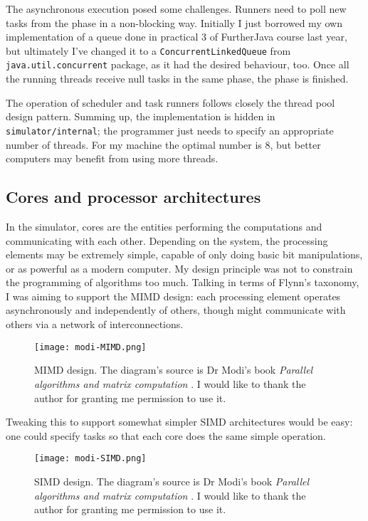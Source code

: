 \documentclass[12pt,a4paper,twoside,openright]{report}
\begin{document}
The asynchronous execution posed some challenges. Runners need to poll new tasks from the phase in a non-blocking way. Initially I just borrowed my own implementation of a queue done in practical 3 of FurtherJava course last year, but ultimately I've changed it to a  \texttt{ConcurrentLinkedQueue} from \texttt{java.util.concurrent} package, as it had the desired behaviour, too. Once all the running threads receive null tasks in the same phase, the phase is finished.

The operation of scheduler and task runners follows closely the thread pool design pattern. Summing up, the implementation is hidden in \texttt{simulator/internal}; the programmer just needs to specify an appropriate number of threads. For my machine the optimal number is $8$, but better computers may benefit from using more threads. 

\subsection{Cores and processor architectures}
In the simulator, cores are the entities performing the computations and communicating with each other. Depending on the system, the processing elements may be extremely simple, capable of only doing basic bit manipulations, or as powerful as a modern computer. My design principle was not to constrain the programming of algorithms too much. Talking in terms of Flynn's taxonomy\cite{Flynn}, I was aiming to support the MIMD design: each processing element operates asynchronously and independently of others, though might communicate with others via a network of interconnections. 

\begin{figure}
  \caption{MIMD design. The diagram's source is Dr Modi's book \textit{Parallel algorithms and matrix computation} \cite{modibook}. I would like to thank the author for granting me permission to use it.}
  \texttt{[image: modi-MIMD.png]}
\end{figure}

Tweaking this to support somewhat simpler SIMD architectures would be easy: one could specify tasks so that each core does the same simple operation. 

\begin{figure}[h]
  \caption{SIMD design. The diagram's source is Dr Modi's book \textit{Parallel algorithms and matrix computation} \cite{modibook}. I would like to thank the author for granting me permission to use it.}
  \texttt{[image: modi-SIMD.png]}
\end{figure}
\end{document}
